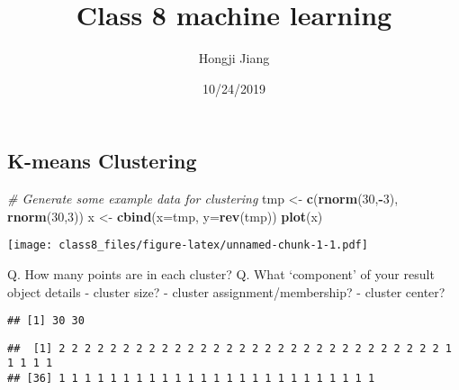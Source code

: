 \documentclass[]{article}
\title{Class 8 machine learning}
\author{Hongji Jiang}
\date{10/24/2019}
\newenvironment{Shaded}{\begin{snugshade}}{\end{snugshade}}
\newcommand{\KeywordTok}[1]{\textcolor[rgb]{0.13,0.29,0.53}{\textbf{#1}}}
\newcommand{\DataTypeTok}[1]{\textcolor[rgb]{0.13,0.29,0.53}{#1}}
\newcommand{\DecValTok}[1]{\textcolor[rgb]{0.00,0.00,0.81}{#1}}
\newcommand{\StringTok}[1]{\textcolor[rgb]{0.31,0.60,0.02}{#1}}
\newcommand{\CommentTok}[1]{\textcolor[rgb]{0.56,0.35,0.01}{\textit{#1}}}
\newcommand{\OperatorTok}[1]{\textcolor[rgb]{0.81,0.36,0.00}{\textbf{#1}}}
\newcommand{\NormalTok}[1]{#1}
\begin{document}
\maketitle

\subsection{K-means Clustering}\label{k-means-clustering}

\begin{Shaded}
\begin{Highlighting}[]
 \CommentTok{# Generate some example data for clustering}
\NormalTok{tmp <-}\StringTok{ }\KeywordTok{c}\NormalTok{(}\KeywordTok{rnorm}\NormalTok{(}\DecValTok{30}\NormalTok{,}\OperatorTok{-}\DecValTok{3}\NormalTok{), }\KeywordTok{rnorm}\NormalTok{(}\DecValTok{30}\NormalTok{,}\DecValTok{3}\NormalTok{))}
\NormalTok{x <-}\StringTok{ }\KeywordTok{cbind}\NormalTok{(}\DataTypeTok{x=}\NormalTok{tmp, }\DataTypeTok{y=}\KeywordTok{rev}\NormalTok{(tmp))}
\KeywordTok{plot}\NormalTok{(x)}
\end{Highlighting}
\end{Shaded}

\texttt{[image: class8\_files/figure-latex/unnamed-chunk-1-1.pdf]}

Q. How many points are in each cluster? Q. What `component' of your
result object details - cluster size? - cluster assignment/membership? -
cluster center?

\begin{Shaded}
\end{Shaded}

\begin{verbatim}
## [1] 30 30
\end{verbatim}

\begin{Shaded}
\end{Shaded}

\begin{verbatim}
##  [1] 2 2 2 2 2 2 2 2 2 2 2 2 2 2 2 2 2 2 2 2 2 2 2 2 2 2 2 2 2 2 1 1 1 1 1
## [36] 1 1 1 1 1 1 1 1 1 1 1 1 1 1 1 1 1 1 1 1 1 1 1 1 1
\end{verbatim}
\end{document}

